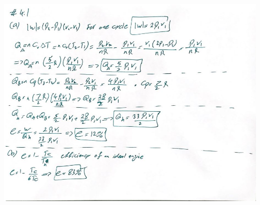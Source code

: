 \documentclass[fleqn]{article}
\begin{document}
\begin{enumerate}
    \begin{center}
      \includegraphics[height=15cm, width=15cm]{41.JPG}
    \end{center}

  \end{enumerate}
\end{document}
